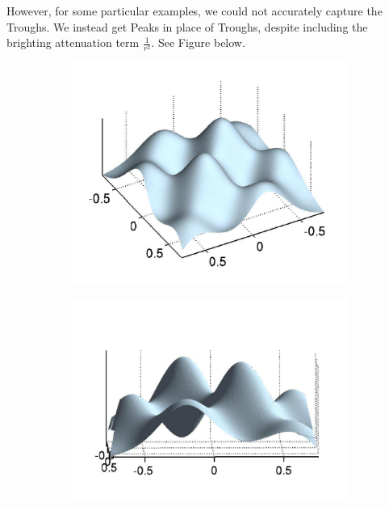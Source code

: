 \documentclass{article}[11pt]
\begin{document}
\noindent
However, for some particular examples, we could not accurately capture the Troughs. We instead get Peaks in place of Troughs, despite including the brighting attenuation term $\frac{1}{r^2}$. See Figure below.
\begin{center}
	\begin{figure}[h!]
	\begin{subfigure}{0.5\textwidth}
		\centering
		\includegraphics[scale = 1]{gt.png}
	\end{subfigure}
	\begin{subfigure}{0.5\textwidth}
		\centering
		\includegraphics[scale = 1]{gt1.png}
	\end{subfigure}
	\begin{subfigure}{0.5\textwidth}

\end{subfigure}
\end{figure}
\end{center}
\end{document}
